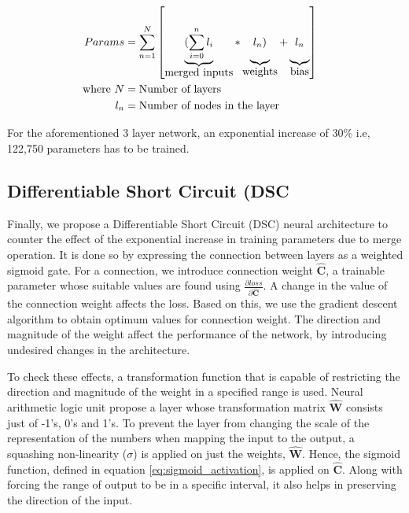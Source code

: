 \documentclass{article}
\let\oldhat\hat
\renewcommand{\hat}[1]{\oldhat{\mathbf{#1}}}
\begin{document}
\begin{equation}
\label{eq:gsc_params}
\begin{aligned}
Params &= \sum_{n=1}^{N}\left[
\underbrace{(\sum_{i=0}^{n}l_{i}\rule[-12pt]{0pt}{5pt}}_{\mbox{merged inputs}}
*\underbrace{l_{n})\rule[-12pt]{0pt}{5pt}}_{\mbox{weights}}
+\underbrace{l_{n}\rule[-12pt]{0pt}{5pt}}_{\mbox{bias}}\right] &\\
\text{where}~N &= \text{Number of layers} \\
l_{n} &= \text{Number of nodes in the layer}\\
\end{aligned}
\end{equation}

For the aforementioned 3 layer network, an exponential increase of 30\% i.e, 122,750 parameters has to be trained.

\subsection{Differentiable Short Circuit (DSC}
\label{sec:dsc}
Finally, we propose a Differentiable Short Circuit (DSC) neural architecture to counter the effect of the exponential increase in training parameters due to merge operation. It is done so by expressing the connection between layers as a weighted sigmoid gate. For a connection, we introduce connection weight $\hat{C}$, a trainable parameter whose suitable values are found using $\frac{\partial loss}{\partial \hat{C}}$. A change in the value of the connection weight affects the loss. Based on this, we use the gradient descent algorithm to obtain optimum values for connection weight. The direction and magnitude of the weight affect the performance of the network, by introducing undesired changes in the architecture. 

To check these effects, a transformation function that is capable of restricting the direction and magnitude of the weight in a specified range is used. Neural arithmetic logic unit \cite{Trask2018NeuralAL} propose a layer whose transformation matrix $\hat{W}$ consists just of -1's, 0's and 1's. To prevent the layer from changing the scale of the representation of the numbers when mapping the input to the output, a squashing non-linearity ($\sigma$) is applied on just the weights, $\hat{W}$.  Hence, the sigmoid function, defined in equation \ref{eq:sigmoid_activation}, is applied on $\hat{C}$. Along with forcing the range of output to be in a specific interval, it also helps in preserving the direction of the input. 
\end{document}
